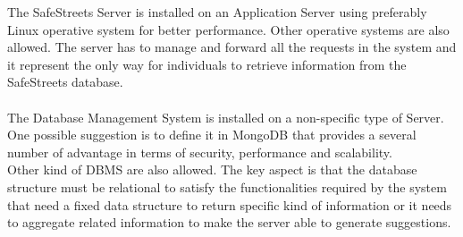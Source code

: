 \documentclass{article}
\begin{document}
   		The SafeStreets Server is installed on an Application Server using preferably Linux operative system for better performance. Other operative systems are also allowed. The server has to manage and forward all the requests in the system and it represent the only way for individuals to retrieve information from the SafeStreets database.\\\\ The Database Management System is installed on a non-specific type of Server. One possible suggestion is to define it in MongoDB that provides a several number of advantage in terms of security, performance and scalability.\\ Other kind of DBMS are also allowed. The key aspect is that the database structure must be relational to satisfy the functionalities required by the system that need a fixed data structure to return specific kind of information or it needs to aggregate related information to make the server able to generate suggestions.
   		 
   		
		
		
		\clearpage
\end{document}
